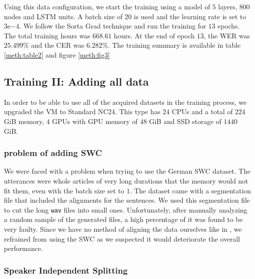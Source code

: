 Using this data configuration, we start the training using a model of $5$ layers, $800$ nodes and \ac{LSTM} units. A batch size of $20$ is used and the learning rate is set to $3\mathrm{e}{-4}$. We follow the Sorta Grad technique and run the training for $13$ epochs. The total training hours was $668.61$ hours. At the end of epoch $13$, the \ac{WER} was $25.499\%$ and the \ac{CER} was $6.282\%$. The training summary is available in table \ref{meth:table2} and figure \ref{meth:fig3}


\subsection{Training II: Adding all data} 
\label{meth:s4_sub4}

In order to be able to use all of the acquired datasets in the training process, we upgraded the \ac{VM} to Standard NC24. This type has $24$ CPUs and a total of $224$ GiB memory, $4$ GPUs with GPU memory of $48$ GiB and SSD storage of $1440$ GiB.


\subsubsection{problem of adding \ac{SWC}} 
\label{meth:s4_sub4_subsub1}

We were faced with a problem when trying to use the German \ac{SWC} dataset. The utterances were whole articles of very long durations that the memory would not fit them, even with the batch size set to $1$. The dataset came with a segmentation file that included the alignments for the sentences. We used this segmentation file to cut the long \texttt{wav} files into small ones. Unfortunately, after manually analyzing a random sample of the generated files, a high percentage of it was found to be very faulty. Since we have no method of aligning the data ourselves like in \cite{amodei2016deep}, we refrained from using the \ac{SWC} as we suspected it would deteriorate the overall performance.

\subsubsection{Speaker Independent Splitting}
\label{meth:s4_sub4_subsub2}


